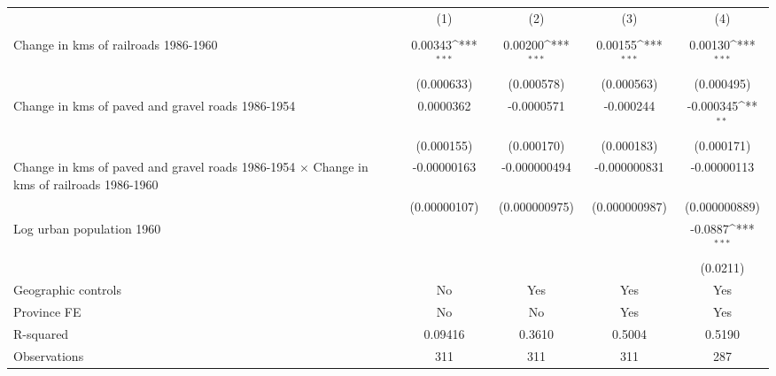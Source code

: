 {
\def\sym#1{\ifmmode^{#1}\else\(^{#1}\)\fi}
\begin{tabular}{l*{4}{c}}
\hline\hline
                &\multicolumn{1}{c}{(1)}&\multicolumn{1}{c}{(2)}&\multicolumn{1}{c}{(3)}&\multicolumn{1}{c}{(4)}\\
                &\multicolumn{1}{c}{}&\multicolumn{1}{c}{}&\multicolumn{1}{c}{}&\multicolumn{1}{c}{}\\
\hline
Change in kms of railroads 1986-1960&  0.00343\sym{***}&  0.00200\sym{***}&  0.00155\sym{***}&  0.00130\sym{***}\\
                &(0.000633)         &(0.000578)         &(0.000563)         &(0.000495)         \\
[1em]
Change in kms of paved and gravel roads 1986-1954&0.0000362         &-0.0000571         &-0.000244         &-0.000345\sym{**} \\
                &(0.000155)         &(0.000170)         &(0.000183)         &(0.000171)         \\
[1em]
Change in kms of paved and gravel roads 1986-1954 $\times$ Change in kms of railroads 1986-1960&-0.00000163         &-0.000000494         &-0.000000831         &-0.00000113         \\
                &(0.00000107)         &(0.000000975)         &(0.000000987)         &(0.000000889)         \\
[1em]
Log urban population 1960&                  &                  &                  &  -0.0887\sym{***}\\
                &                  &                  &                  & (0.0211)         \\
\hline
Geographic controls&       No         &      Yes         &      Yes         &      Yes         \\
Province FE     &       No         &       No         &      Yes         &      Yes         \\
R-squared       &  0.09416         &   0.3610         &   0.5004         &   0.5190         \\
Observations    &      311         &      311         &      311         &      287         \\
\hline\hline
\end{tabular}
}
